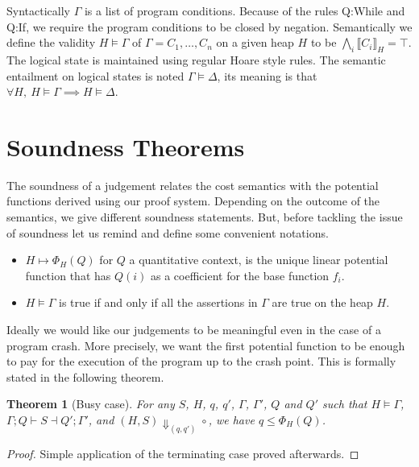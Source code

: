 \documentclass[nocopyrightspace,preprint]{sigplanconf}
\newtheorem{theorem}{Theorem}
\begin{document}
Syntactically $\Gamma$ is a list of program conditions.  Because of the
rules {\sc Q:While} and {\sc Q:If}, we require the program conditions
to be closed by negation.  Semantically we define the validity
$H \models \Gamma$ of $\Gamma = C_1, \dots, C_n$ on a given
heap $H$ to be $\bigwedge_i \llbracket C_i \rrbracket_H = \top$.
%
The logical state
is maintained using regular Hoare style rules.
The semantic entailment on logical states is noted $\Gamma \models \Delta$,
its meaning is that $\forall H,~ H\models\Gamma \implies H\models\Delta$.


\section{Soundness Theorems}

The soundness of a judgement relates the cost semantics with the potential
functions derived using our proof system.  Depending on the outcome of
the semantics, we give different soundness statements.
But, before tackling the issue of soundness let us remind and define some
convenient notations.
\begin{itemize}
\item $H \mapsto \Phi_H(Q)$ for $Q$ a quantitative context, is the
unique linear potential function that has $Q(i)$ as a coefficient for the
base function $f_i$.
\item $H \models \Gamma$ is true if and only if all the assertions in
$\Gamma$ are true on the heap $H$.
\end{itemize}

Ideally we would
like our judgements to be meaningful even in the case of a program
crash.  More precisely, we want the first potential function to be enough
to pay for the execution of the program up to the crash point.  This is
formally stated in the following theorem.

\begin{theorem}[Busy case]
For any $S$, $H$, $q$, $q'$, $\Gamma$, $\Gamma'$, $Q$ and $Q'$
such that $H \models \Gamma$, $\Gamma; Q \vdash S \dashv Q'; \Gamma'$,
  and $(H, S) \Downarrow_{(q,q')} \circ$,
we have $q \le \Phi_H(Q)$.
\end{theorem}
\begin{proof}
Simple application of the terminating case proved afterwards.
\end{proof}
\end{document}
